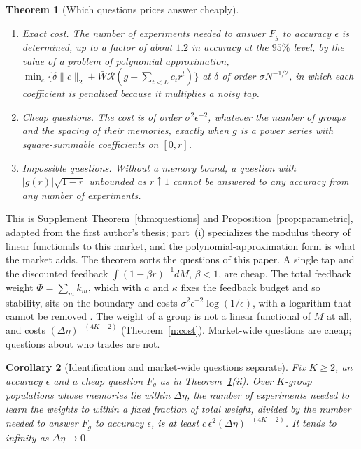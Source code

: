 \documentclass[12pt]{article}
\newtheorem{theorem}{Theorem}[section]
\newtheorem{corollary}[theorem]{Corollary}
\theoremstyle{definition}
\theoremstyle{remark}
\begin{document}
\begin{theorem}[Which questions prices answer cheaply]\label{n:questions}
\begin{enumerate}[label=(\roman*),itemsep=1pt]
\item \emph{Exact cost.} The number of experiments needed to answer $F_g$ to accuracy $\epsilon$ is determined, up to a factor of about $1.2$ in accuracy at the $95\%$ level, by the value of a problem of polynomial approximation, $\min_c\{\delta\|c\|_2+\bar W\mathcal R(g-\sum_{t<L}c_tr^t)\}$ at $\delta$ of order $\sigma N^{-1/2}$, in which each coefficient is penalized because it multiplies a noisy tap.
\item \emph{Cheap questions.} The cost is of order $\sigma^2\epsilon^{-2}$, whatever the number of groups and the spacing of their memories, exactly when $g$ is a power series with square-summable coefficients on $[0,\bar r]$.
\item \emph{Impossible questions.} Without a memory bound, a question with $|g(r)|\sqrt{1-r}$ unbounded as $r\uparrow1$ cannot be answered to any accuracy from any number of experiments.
\end{enumerate}
\end{theorem}

This is Supplement Theorem~\ref{thm:questions} and Proposition~\ref{prop:parametric}, adapted from the first author's thesis; part~(i) specializes the modulus theory of linear functionals \citep{donoho1994} to this market, and the polynomial-approximation form is what the market adds. The theorem sorts the questions of this paper. A single tap and the discounted feedback $\int(1-\beta r)^{-1}dM$, $\beta<1$, are cheap. The total feedback weight $\Phi=\sum_mk_m$, which with $a$ and $\kappa$ fixes the feedback budget and so stability, sits on the boundary and costs $\sigma^2\epsilon^{-2}\log(1/\epsilon)$, with a logarithm that cannot be removed \citep{niroula2026b}. The weight of a group is not a linear functional of $M$ at all, and costs $(\Delta\eta)^{-(4K-2)}$ (Theorem~\ref{n:cost}). Market-wide questions are cheap; questions about who trades are not.

\begin{corollary}[Identification and market-wide questions separate]\label{n:sep}
Fix $K\ge2$, an accuracy $\epsilon$ and a cheap question $F_g$ as in Theorem~\ref{n:questions}(ii). Over $K$-group populations whose memories lie within $\Delta\eta$, the number of experiments needed to learn the weights to within a fixed fraction of total weight, divided by the number needed to answer $F_g$ to accuracy $\epsilon$, is at least $c\,\epsilon^2(\Delta\eta)^{-(4K-2)}$. It tends to infinity as $\Delta\eta\to0$.
\end{corollary}
\end{document}
